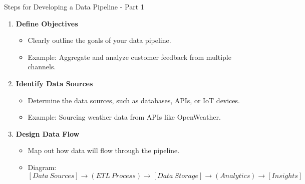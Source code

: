 \documentclass[aspectratio=169]{beamer}
\begin{document}
\begin{frame}[fragile]{Steps for Developing a Data Pipeline - Part 1}
    \begin{enumerate}
        \item \textbf{Define Objectives}
        \begin{itemize}
            \item Clearly outline the goals of your data pipeline. 
            \item Example: Aggregate and analyze customer feedback from multiple channels.
        \end{itemize}
        
        \item \textbf{Identify Data Sources}
        \begin{itemize}
            \item Determine the data sources, such as databases, APIs, or IoT devices.
            \item Example: Sourcing weather data from APIs like OpenWeather.
        \end{itemize}
        
        \item \textbf{Design Data Flow}
        \begin{itemize}
            \item Map out how data will flow through the pipeline. 
            \item Diagram: 
            \[
            [Data\ Sources] \rightarrow (ETL\ Process) \rightarrow [Data\ Storage] \rightarrow (Analytics) \rightarrow [Insights]
            \]
        \end{itemize}
    \end{enumerate}
\end{frame}
\end{document}
